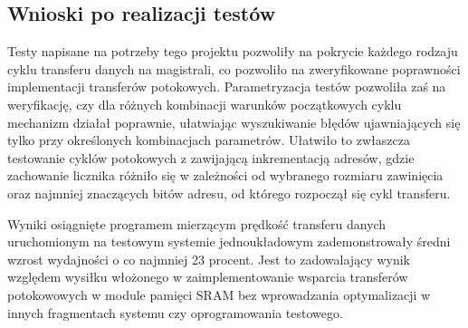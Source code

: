 \subsection{Wnioski po realizacji testów}

Testy napisane na potrzeby tego projektu pozwoliły na pokrycie każdego rodzaju cyklu transferu danych na magistrali, co pozwoliło na zweryfikowane poprawności implementacji transferów potokowych. Parametryzacja testów pozwoliła zaś na weryfikację, czy dla różnych kombinacji warunków początkowych cyklu mechanizm działał poprawnie, ułatwiając wyszukiwanie błędów ujawniających się tylko przy określonych kombinacjach parametrów. Ułatwiło to zwłaszcza testowanie cyklów potokowych z zawijającą inkrementacją adresów, gdzie zachowanie licznika różniło się w zależności od wybranego rozmiaru zawinięcia oraz najmniej znaczących bitów adresu, od którego rozpoczął się cykl transferu.

Wyniki osiągnięte programem mierzącym prędkość transferu danych uruchomionym na testowym systemie jednoukładowym zademonstrowały średni wzrost wydajności o co najmniej 23 procent. Jest to zadowalający wynik względem wysiłku włożonego w zaimplementowanie wsparcia transferów potokowowych w module pamięci SRAM bez wprowadzania optymalizacji w innych fragmentach systemu czy oprogramowania testowego.
